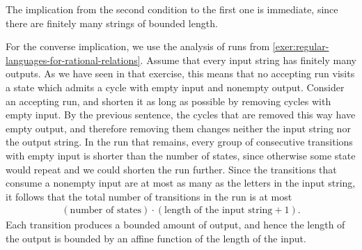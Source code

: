 {
    The implication from the second condition to the first one is immediate, since there are finitely many strings of bounded length.

    For the converse implication, we use the analysis of runs from \cref{exer:regular-languages-for-rational-relations}. Assume that every input string has finitely many outputs. As we have seen in that exercise, this means that no accepting run visits a state which admits a cycle with empty input and nonempty output. Consider an accepting run, and shorten it as long as possible by removing cycles with empty input. By the previous sentence, the cycles that are removed this way have empty output, and therefore removing them changes neither the input string nor the output string. In the run that remains, every group of consecutive transitions with empty input is shorter than the number of states, since otherwise some state would repeat and we could shorten the run further. Since the transitions that consume a nonempty input are at most as many as the letters in the input string, it follows that the total number of transitions in the run is at most
    \begin{align*}
    (\text{number of states}) \cdot (\text{length of the input string} + 1).
    \end{align*}
    Each transition produces a bounded amount of output, and hence the length of the output is bounded by an affine function of the length of the input.
}


